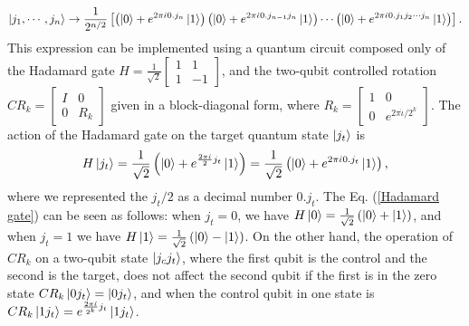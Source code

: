 \documentclass[10pt]{article}
\begin{document}
	\begin{equation}
		\ket{j_1,\cdots, j_n}\rightarrow\frac{1}{2^{n/2}} \left[\left(\ket{0}+e^{2\pi\dot{\iota} 0.j_n}\ket{1}\right)\left(\ket{0}+e^{2\pi\dot{\iota} 0.j_{n-1}j_n}\ket{1}\right)\cdots\left(\ket{0}+e^{2\pi\dot{\iota} 0.j_1 j_2\cdots j_n}\ket{1}\right) \right].
	\end{equation}
	This expression can be implemented using a quantum circuit composed only of the Hadamard gate $H = \frac{1}{\sqrt{2}} \begin{bmatrix} 1 & 1 \\ 1 & -1 \end{bmatrix}$, and the two-qubit controlled rotation $CR_k=\begin{bmatrix}
		I & 0\\
		0& R_{k}
	\end{bmatrix}$ given in a block-diagonal form,
	where
	$
	R_{k}=\begin{bmatrix}
		1 & 0\\
		0& e^{2\pi \dot{\iota}/2^{k}}
	\end{bmatrix}.
	$
	The action of the Hadamard gate on the target quantum state $\ket{j_t}$ is
	\begin{equation} \label{Hadamard gate}
		H\ket{j_t}=\frac{1}{\sqrt{2}}\left(\ket{0}+e^{\frac{2\pi \dot{\iota}}{2}j_{t}}\ket{1}\right)=\frac{1}{\sqrt{2}}\left(\ket{0}+e^{2\pi \dot{\iota} 0.j_{t}}\ket{1}\right),
	\end{equation}
	where we represented the $j_t/2$ as a decimal number $0.j_t$. The Eq. (\ref{Hadamard gate}) can be seen as follows: when $j_t=0$, we have $H\ket{0}=\frac{1}{\sqrt{2}}\left(\ket{0}+\ket{1}\right)$,  and when $j_t=1$ we have $H\ket{1}=\frac{1}{\sqrt{2}}\left(\ket{0}-\ket{1}\right)$.
	On the other hand, the operation of $CR_k$ on a two-qubit state $\ket{j_c j_t}$, where the first qubit is the control and the second is the target, does not affect the second qubit if the first is in the zero state
	$
	CR_{k}\ket{0j_{t}}=\ket{0j_{t}}
	$,
	and when the control qubit in one state is
	$
	CR_{k}\ket{1j_{t}}=e^{\frac{2\pi \dot{\iota}}{2^{k}}j_{t}}\ket{1j_{t}}
	$.
	
\end{document}
